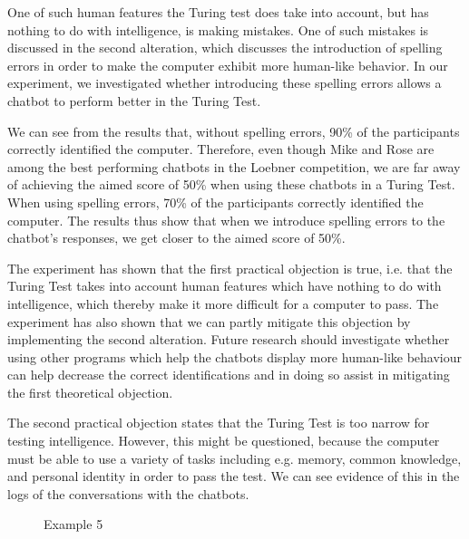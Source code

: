 One of such human features the Turing test does take into account, but has nothing to do with intelligence, is making mistakes. One of such mistakes is discussed in the second alteration, which discusses the introduction of spelling errors in order to make the computer exhibit more human-like behavior. In our experiment, we investigated whether introducing these spelling errors allows a chatbot to perform better in the Turing Test.

We can see from the results that, without spelling errors, 90\% of the participants correctly identified the computer. Therefore, even though Mike and Rose are among the best performing chatbots in the Loebner competition, we are far away of achieving the aimed score of 50\% when using these chatbots in a Turing Test. When using spelling errors, 70\% of the participants correctly identified the computer. The results thus show that when we introduce spelling errors to the chatbot's responses, we get closer to the aimed score of 50\%.

The experiment has shown that the first practical objection is true, i.e. that the Turing Test takes into account human features which have nothing to do with intelligence, which thereby make it more difficult for a computer to pass. The experiment has also shown that we can partly mitigate this objection by implementing the second alteration. Future research should investigate whether using other programs which help the chatbots display more human-like behaviour can help decrease the correct identifications and in doing so assist in mitigating the first theoretical objection.

The second practical objection states that the Turing Test is too narrow for testing intelligence. However, this might be questioned, because the computer must be able to use a variety of tasks including e.g. memory, common knowledge, and personal identity in order to pass the test. We can see evidence of this in the logs of the conversations with the chatbots.

\begin{figure}[ht]
   \begin{center}
   \end{center}
   \caption{Example 5}
\end{figure}

